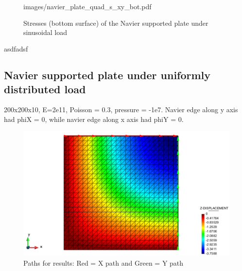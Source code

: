 \begin{figure}[H]
{		{images/navier_plate_quad_s_xy_bot.pdf}}
	\caption{\label{Navier_quad_s_xx_yy}Stresses (bottom surface) of the Navier supported plate under sinusoidal load}
\end{figure}

asdfadsf

\newpage
\subsection{Navier supported plate under uniformly distributed load}

200x200x10, E=2e11, Poisson = 0.3, pressure = -1e7.  Navier edge along y axis had phiX = 0, while navier edge along x axis had phiY = 0.

\begin{figure}[h!]
	\centering
	\includegraphics[width=14cm]{images/navier_thick_tri_paths}
	\caption{Paths for results: Red = X path and Green = Y path}
	\label{fig:navierthicktripaths}
\end{figure}


